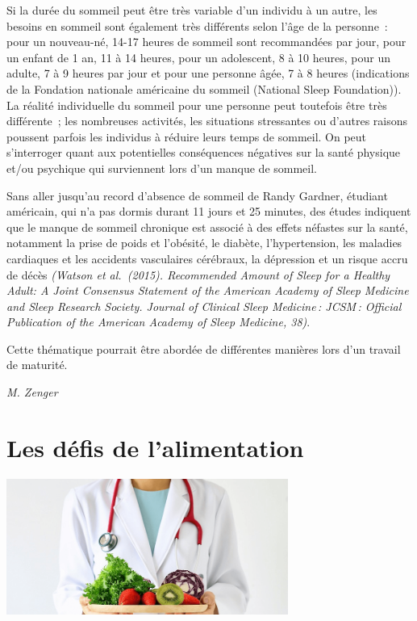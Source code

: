 \documentclass[
  10pt,
  french,
  a5paper,
  openany]{book}
\newenvironment{signature}{\begin{flushright}}{\end{flushright}}
\begin{document}
Si la durée du sommeil peut être très variable d'un individu à un autre, les besoins en sommeil sont également très différents selon l'âge de la personne~: pour un nouveau-né, 14-17 heures de sommeil sont recommandées par jour, pour un enfant de 1 an, 11 à 14 heures, pour un adolescent, 8 à 10 heures, pour un adulte, 7 à 9 heures par jour et pour une personne âgée, 7 à 8 heures (indications de la Fondation nationale américaine du sommeil (National Sleep Foundation)). La réalité individuelle du sommeil pour une personne peut toutefois être très différente~; les nombreuses activités, les situations stressantes ou d'autres raisons poussent parfois les individus à réduire leurs temps de sommeil. On peut s'interroger quant aux potentielles conséquences négatives sur la santé physique et/ou psychique qui surviennent lors d'un manque de sommeil.

Sans aller jusqu'au record d'absence de sommeil de Randy Gardner, étudiant américain, qui n'a pas dormis durant 11 jours et 25 minutes, des études indiquent que le manque de sommeil chronique est associé à des effets néfastes sur la santé, notamment la prise de poids et l'obésité, le diabète, l'hypertension, les maladies cardiaques et les accidents vasculaires cérébraux, la dépression et un risque accru de décès \emph{(Watson et al.~(2015). Recommended Amount of Sleep for a Healthy Adult: A Joint Consensus Statement of the American Academy of Sleep Medicine and Sleep Research Society. Journal of Clinical Sleep Medicine\,: JCSM\,: Official Publication of the American Academy of Sleep Medicine, 38)}.

Cette thématique pourrait être abordée de différentes manières lors d'un travail de maturité.

\begin{signature}
\emph{M. Zenger}

\end{signature}

\hypertarget{les-duxe9fis-de-lalimentation}{%
\chapter{Les défis de l'alimentation}\label{les-duxe9fis-de-lalimentation}}

\begin{center}
\includegraphics[width=\textwidth,height=12em]{images/les-defis-de-lalimentation.png}

\end{center}
\end{document}
